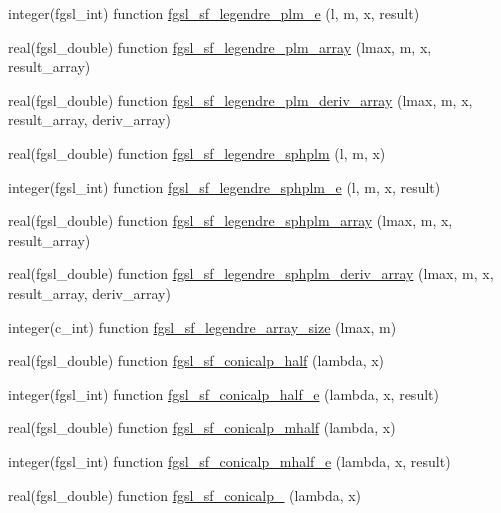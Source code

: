 \begin{DoxyCompactItemize}
\item 
integer(fgsl\-\_\-int) function \hyperlink{specfunc_8finc_a11383b00066d2ced2e3524326b1d5c80}{fgsl\-\_\-sf\-\_\-legendre\-\_\-plm\-\_\-e} (l, m, x, result)
\item 
real(fgsl\-\_\-double) function \hyperlink{specfunc_8finc_a77600a62d38529aa0f00edfe567d4b11}{fgsl\-\_\-sf\-\_\-legendre\-\_\-plm\-\_\-array} (lmax, m, x, result\-\_\-array)
\item 
real(fgsl\-\_\-double) function \hyperlink{specfunc_8finc_a855f45661e71888c2181a5fb352ff6d2}{fgsl\-\_\-sf\-\_\-legendre\-\_\-plm\-\_\-deriv\-\_\-array} (lmax, m, x, result\-\_\-array, deriv\-\_\-array)
\item 
real(fgsl\-\_\-double) function \hyperlink{specfunc_8finc_a98af4aba68beb6b6f9630db934f6e003}{fgsl\-\_\-sf\-\_\-legendre\-\_\-sphplm} (l, m, x)
\item 
integer(fgsl\-\_\-int) function \hyperlink{specfunc_8finc_a1cba953d6b10e13eda8a407fb8025a6f}{fgsl\-\_\-sf\-\_\-legendre\-\_\-sphplm\-\_\-e} (l, m, x, result)
\item 
real(fgsl\-\_\-double) function \hyperlink{specfunc_8finc_adef22f22a5536ebff61c9dafa805915a}{fgsl\-\_\-sf\-\_\-legendre\-\_\-sphplm\-\_\-array} (lmax, m, x, result\-\_\-array)
\item 
real(fgsl\-\_\-double) function \hyperlink{specfunc_8finc_a9c4907dfb8e793fbb06bba0d1da3177b}{fgsl\-\_\-sf\-\_\-legendre\-\_\-sphplm\-\_\-deriv\-\_\-array} (lmax, m, x, result\-\_\-array, deriv\-\_\-array)
\item 
integer(c\-\_\-int) function \hyperlink{specfunc_8finc_a6df67a5331537dc96e40094b935d8420}{fgsl\-\_\-sf\-\_\-legendre\-\_\-array\-\_\-size} (lmax, m)
\item 
real(fgsl\-\_\-double) function \hyperlink{specfunc_8finc_af47a6418398d7e389d60906572c597fc}{fgsl\-\_\-sf\-\_\-conicalp\-\_\-half} (lambda, x)
\item 
integer(fgsl\-\_\-int) function \hyperlink{specfunc_8finc_a7b02a030c69d177bd52361b67c7356bf}{fgsl\-\_\-sf\-\_\-conicalp\-\_\-half\-\_\-e} (lambda, x, result)
\item 
real(fgsl\-\_\-double) function \hyperlink{specfunc_8finc_a2b7fae81306ac8f6f1fcc41cdf972236}{fgsl\-\_\-sf\-\_\-conicalp\-\_\-mhalf} (lambda, x)
\item 
integer(fgsl\-\_\-int) function \hyperlink{specfunc_8finc_a86b8b852607f9dc665b1fef86dd7aba5}{fgsl\-\_\-sf\-\_\-conicalp\-\_\-mhalf\-\_\-e} (lambda, x, result)
\item 
real(fgsl\-\_\-double) function \hyperlink{specfunc_8finc_a7475f8415e567c47f5791cb480304c4d}{fgsl\-\_\-sf\-\_\-conicalp\-\_} (lambda, x)

\end{DoxyCompactItemize}
